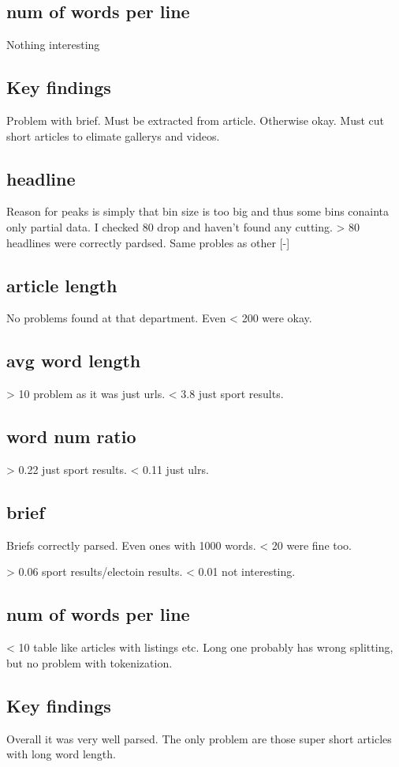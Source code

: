\documentclass{article}
\begin{document}
    \subsection{num of words per line}
    Nothing interesting

    \subsection{Key findings}
    Problem with brief. Must be extracted from article. Otherwise okay.
    Must cut short articles to elimate gallerys and videos.

    \subsection{headline}
    Reason for peaks is simply that bin size is too big and thus some bins conainta only partial data. I checked 80 drop and haven't found any cutting.
    > 80 headlines were correctly pardsed. Same probles as other [-]

    \subsection{article length}
    No problems found at that department. Even < 200 were okay.

    \subsection{avg word length}
    > 10 problem as it was just urls. < 3.8  just sport results.

    \subsection{word num ratio}
    > 0.22 just sport results. < 0.11 just ulrs.

    \subsection{brief}
    Briefs correctly parsed.  Even ones with 1000 words. < 20 were fine too.

    > 0.06 sport results/electoin results. < 0.01 not interesting.

    \subsection{num of words per line}
    < 10 table like articles with listings etc. Long one probably has wrong splitting, but no problem with tokenization.

    \subsection{Key findings}
    Overall it was very well parsed. The only problem are those super short articles with long word length.

    




    



    \printbibliography
\end{document}
